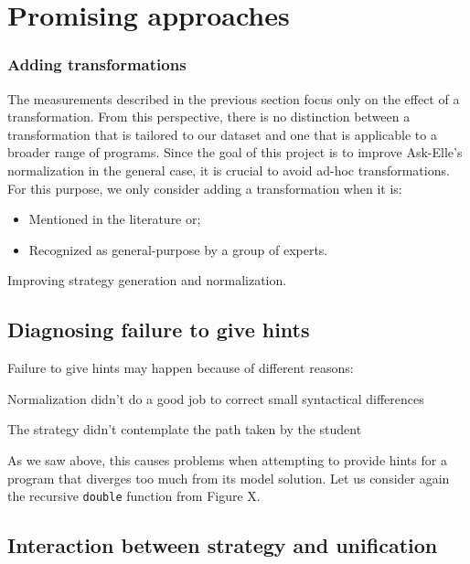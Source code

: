 \chapter{Promising approaches}

\subsection{Adding transformations}

The measurements described in the previous section focus only on the effect of a transformation. From this perspective, there is no distinction between a transformation that is tailored to our dataset and one that is applicable to a broader range of programs. Since the goal of this project is to improve Ask-Elle's normalization in the general case, it is crucial to avoid ad-hoc transformations. For this purpose, we only consider adding a transformation when it is:

\begin{itemize}
    \item Mentioned in the literature or;
    \item Recognized as general-purpose by a group of experts.
\end{itemize}

Improving strategy generation and normalization.

\section{Diagnosing failure to give hints}

Failure to give hints may happen because of different reasons:

Normalization didn't do a good job to correct small syntactical differences

The strategy didn't contemplate the path taken by the student

As we saw above, this causes problems when attempting to provide hints for a program that diverges too much from its model solution. Let us consider again the recursive \texttt{double} function from Figure X.



\section{Interaction between strategy and unification}
\label{sec:interaction-norm-strat}

